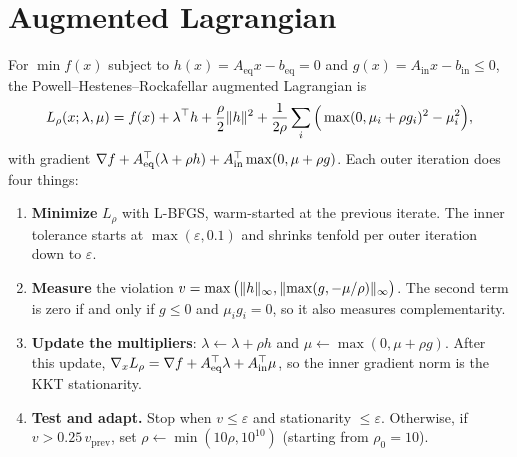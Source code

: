 \section{Augmented Lagrangian}\label{c:sec:al}
For $\min f(x)$ subject to $h(x)=A_{\text{eq}}x-b_{\text{eq}}=0$ and
$g(x)=A_{\text{in}}x-b_{\text{in}}\le0$, the Powell--Hestenes--Rockafellar augmented
Lagrangian is
\[
  L_\rho(x;\lambda,\mu)=f(x)+\lambda^\top h+\frac\rho2\lVert h\rVert^2
  +\frac1{2\rho}\sum_i\Big(\max(0,\mu_i+\rho g_i)^2-\mu_i^2\Big),
\]
with gradient
$\nabla f+A_{\text{eq}}^\top(\lambda+\rho h)+A_{\text{in}}^\top\max(0,\mu+\rho g)$.
Each outer iteration does four things:
\begin{enumerate}
  \item \textbf{Minimize} $L_\rho$ with L-BFGS, warm-started at the previous iterate. The
        inner tolerance starts at $\max(\varepsilon,0.1)$ and shrinks tenfold per outer
        iteration down to $\varepsilon$.
  \item \textbf{Measure} the violation
        $v=\max\big(\lVert h\rVert_\infty,\lVert \max(g,-\mu/\rho)\rVert_\infty\big)$. The second term is
        zero if and only if $g\le0$ and $\mu_ig_i=0$, so it also measures complementarity.
  \item \textbf{Update the multipliers}: $\lambda\leftarrow\lambda+\rho h$ and
        $\mu\leftarrow\max(0,\mu+\rho g)$. After this update,
        $\nabla_xL_\rho=\nabla f+A_{\text{eq}}^\top\lambda+A_{\text{in}}^\top\mu$, so the inner
        gradient norm is the KKT stationarity.
  \item \textbf{Test and adapt.} Stop when $v\le\varepsilon$ and stationarity
        $\le\varepsilon$. Otherwise, if $v>0.25\,v_{\text{prev}}$, set
        $\rho\leftarrow\min(10\rho,10^{10})$ (starting from $\rho_0=10$).
\end{enumerate}
\begin{codepointers}
\end{codepointers}

